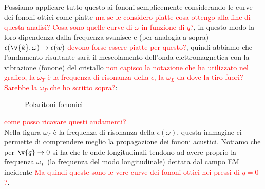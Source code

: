 Possiamo applicare tutto questo ai fononi semplicemente considerando le curve dei fononi ottici come piatte \textcolor{red}{ma se le considero piatte cosa ottengo alla fine di questa analisi? Cosa sono quelle curve di $\omega$ in funzione di $q$?}, in questo modo la loro dipendenza dalla frequenza svanisce e (per analogia a sopra) $\epsilon (\v{k},\omega) \to \epsilon (w)$ \textcolor{red}{devono forse essere piatte per questo?}, quindi abbiamo che l'andamento risultante sarà il mescolamento dell'onda elettromagnetica con la vibrazione (fonone) del cristallo \textcolor{red}{non capisco la notazione che ha utilizzato nel grafico, la $\omega_T$ è la frequenza di risonanza della $\epsilon$, la $\omega_L$ da dove la tiro fuori? Sarebbe la $\omega_P$ che ho scritto sopra?}:
\begin{figure}[H]
    \centering
    \caption{Polaritoni fononici}
    \label{fig:polaritoni-fononici}
\end{figure}
\noindent
\textcolor{red}{come posso ricavare questi andamenti?}\\
Nella figura $\omega_T$ è la frequenza di risonanza della $\epsilon(\omega)$, questa immagine ci permette di comprendere meglio la propagazione dei fononi acustici. Notiamo che per $\v{q}\to 0$ si ha che le onde longitudinali tendono ad avere proprio la frequenza $\omega_L$ (la frequenza del modo longitudinale) dettata dal campo EM incidente \textcolor{red}{Ma quindi queste sono le vere curve dei fononi ottici nei pressi di $q=0$?}.
